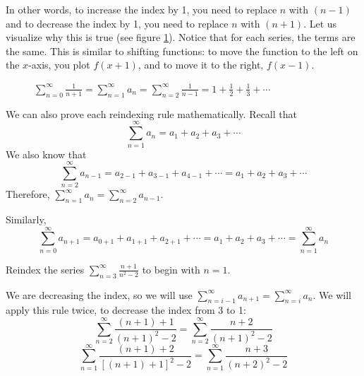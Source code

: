 In other words, to increase the index by 1, you need to replace $n$ with $(n-1)$ and
to decrease the index by 1, you need to replace $n$ with $(n+1)$. Let us 
visualize why this is true (see figure \ref{fig:reindex}). Notice that for 
each series, the terms are the same. This is similar to shifting functions: 
to move the function to the left on the $x$-axis, you plot $f(x + 1)$, and to 
move it to the right, $f(x - 1)$. 

\begin{figure}[H]
\centering
    \caption{$\sum_{n=0}^\infty \frac{1}{n + 1} = \sum_{n=1}^\infty a_n = 
    \sum_{n=2}^\infty \frac{1}{n-1} = 1 + \frac{1}{2} + \frac{1}{3} + \cdots$}
    \label{fig:reindex}
\end{figure}

We can also prove each reindexing rule mathematically. Recall that 
$$\sum_{n=1}^\infty a_n = a_1 + a_2 + a_3 + \cdots$$
We also know that 
$$\sum_{n=2}^\infty a_{n-1} = a_{2-1} + a_{3-1} + a_{4-1} + \cdots = a_1 + a_2 
+ a_3 + \cdots$$
Therefore, $\sum_{n=1}^\infty a_n = \sum_{n=2}^\infty a_{n-1}$. 

Similarly, 
$$\sum_{n=0}^\infty a_{n + 1} = a_{0+1} + a_{1+1} + a_{2+1} + \cdots = a_1 + 
a_2 + a_3 + \cdots = \sum_{n=1}^\infty a_n$$

\begin{Worked}
\begin{Problem}
Reindex the series $\sum_{n=3}^\infty \frac{n + 1}{n^2 - 2}$ 
to begin with $n=1$.
\end{Problem}
\begin{Solution}
We are decreasing the index, so we will use $\sum_{n=i-1}^
\infty a_{n+1} = \sum_{n=i}^\infty a_n$. We will apply this rule twice, to 
decrease the index from 3 to 1:
$$\sum_{n=2}^\infty \frac{(n + 1) + 1}{(n + 1)^2 - 2} = \sum_{n=2}^\infty 
\frac{n + 2}{(n + 1)^2 - 2}$$
$$\sum_{n=1}^\infty \frac{(n + 1) + 2}{\left[ (n + 1) + 1 \right]^2 - 2} = 
\sum_{n=1}^\infty \frac{n + 3}{(n + 2)^2 - 2}$$
\end{Solution}
\end{Worked}

